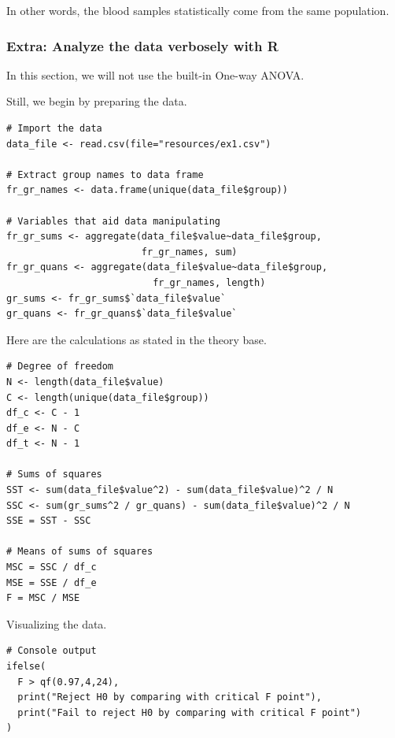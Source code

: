 \documentclass[a4paper]{article}
\numberwithin{equation}{section}
\begin{document}
In other words, the blood samples statistically come from the same population.

\subsubsection{Extra: Analyze the data verbosely with R}
In this section, we will not use the built-in One-way ANOVA.

Still, we begin by preparing the data.
\begin{mdframed}[leftline=false,rightline=false,backgroundcolor=magenta!10,nobreak=true]
  \begin{verbatim}
# Import the data
data_file <- read.csv(file="resources/ex1.csv")

# Extract group names to data frame
fr_gr_names <- data.frame(unique(data_file$group))

# Variables that aid data manipulating
fr_gr_sums <- aggregate(data_file$value~data_file$group,
                        fr_gr_names, sum)
fr_gr_quans <- aggregate(data_file$value~data_file$group,
                          fr_gr_names, length)
gr_sums <- fr_gr_sums$`data_file$value`
gr_quans <- fr_gr_quans$`data_file$value`
  \end{verbatim}
\end{mdframed}

Here are the calculations as stated in the theory base.
\begin{mdframed}[leftline=false,rightline=false,backgroundcolor=magenta!10,nobreak=true]
  \begin{verbatim}
# Degree of freedom
N <- length(data_file$value)
C <- length(unique(data_file$group))
df_c <- C - 1
df_e <- N - C
df_t <- N - 1

# Sums of squares
SST <- sum(data_file$value^2) - sum(data_file$value)^2 / N
SSC <- sum(gr_sums^2 / gr_quans) - sum(data_file$value)^2 / N
SSE = SST - SSC

# Means of sums of squares
MSC = SSC / df_c
MSE = SSE / df_e
F = MSC / MSE
  \end{verbatim}
\end{mdframed}

Visualizing the data.
\begin{mdframed}[leftline=false,rightline=false,backgroundcolor=magenta!10,nobreak=true]
  \begin{verbatim}
# Console output
ifelse(
  F > qf(0.97,4,24),
  print("Reject H0 by comparing with critical F point"),
  print("Fail to reject H0 by comparing with critical F point")
)
  \end{verbatim}
\end{mdframed}
\end{document}
